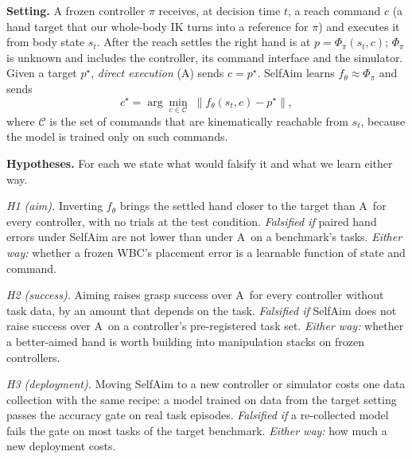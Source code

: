 \documentclass[conference]{IEEEtran}
\newcommand{\Ad}{\textsc{A}}       %
\begin{document}
\textbf{Setting.} A frozen controller $\pi$ receives, at decision time $t$, a reach command $c$ (a hand target that our whole-body IK turns into a reference for $\pi$) and executes it from body state $s_t$. After the reach settles the right hand is at $p=\Phi_\pi(s_t,c)$; $\Phi_\pi$ is unknown and includes the controller, its command interface and the simulator. Given a target $p^\star$, \emph{direct execution} (\Ad) sends $c=p^\star$. SelfAim learns $f_\theta\approx\Phi_\pi$ and sends
\begin{equation}
c^\star=\arg\min_{c\in\mathcal{C}}\;\lVert f_\theta(s_t,c)-p^\star\rVert ,
\label{eq:inv}
\end{equation}
where $\mathcal{C}$ is the set of commands that are kinematically reachable from $s_t$, because the model is trained only on such commands.

\textbf{Hypotheses.} For each we state what would falsify it and what we learn either way.

\emph{H1 (aim).} Inverting $f_\theta$ brings the settled hand closer to the target than \Ad\ for every controller, with no trials at the test condition. \emph{Falsified if} paired hand errors under SelfAim are not lower than under \Ad\ on a benchmark's tasks. \emph{Either way:} whether a frozen WBC's placement error is a learnable function of state and command.

\emph{H2 (success).} Aiming raises grasp success over \Ad\ for every controller without task data, by an amount that depends on the task. \emph{Falsified if} SelfAim does not raise success over \Ad\ on a controller's pre-registered task set. \emph{Either way:} whether a better-aimed hand is worth building into manipulation stacks on frozen controllers.

\emph{H3 (deployment).} Moving SelfAim to a new controller or simulator costs one data collection with the same recipe: a model trained on data from the target setting passes the accuracy gate on real task episodes. \emph{Falsified if} a re-collected model fails the gate on most tasks of the target benchmark. \emph{Either way:} how much a new deployment costs.
\end{document}
